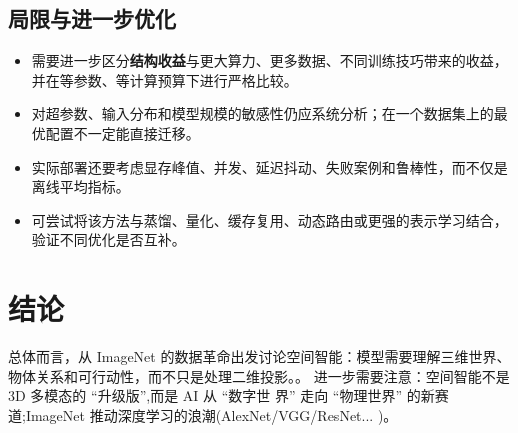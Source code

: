 \documentclass[UTF8,11pt,a4paper]{ctexart}
\newcommand{\term}[1]{\textbf{\textcolor{mainblue}{#1}}}
\begin{document}
\subsection{局限与进一步优化}
\begin{itemize}
\item 需要进一步区分\term{结构收益}与更大算力、更多数据、不同训练技巧带来的收益，并在等参数、等计算预算下进行严格比较。
\item 对超参数、输入分布和模型规模的敏感性仍应系统分析；在一个数据集上的最优配置不一定能直接迁移。
\item 实际部署还要考虑显存峰值、并发、延迟抖动、失败案例和鲁棒性，而不仅是离线平均指标。
\item 可尝试将该方法与蒸馏、量化、缓存复用、动态路由或更强的表示学习结合，验证不同优化是否互补。
\end{itemize}

\section{结论}
总体而言，从 ImageNet 的数据革命出发讨论空间智能：模型需要理解三维世界、物体关系和可行动性，而不只是处理二维投影。。 进一步需要注意：空间智能不是 3D 多模态的 “升级版”,而是 AI 从 “数字世 界” 走向 “物理世界” 的新赛道;ImageNet 推动深度学习的浪潮(AlexNet/VGG/ResNet... )。
\end{document}
